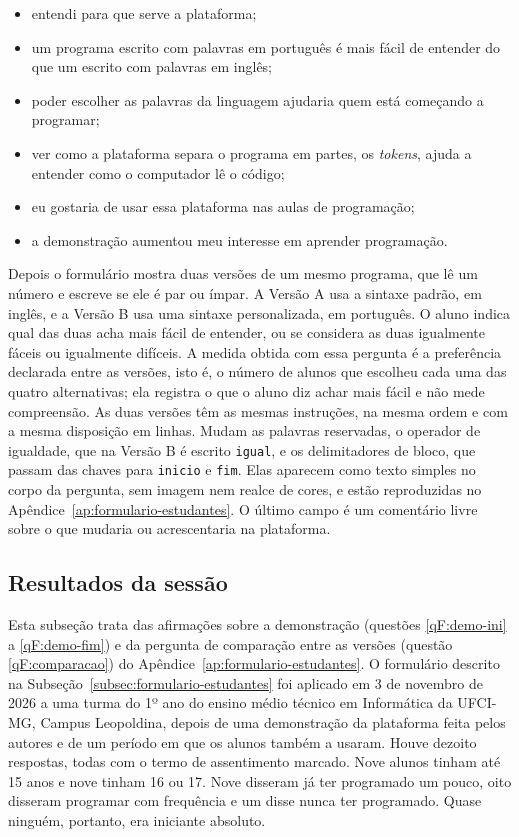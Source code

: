 \begin{itemize}
    \item entendi para que serve a plataforma;
    \item um programa escrito com palavras em português é mais fácil de entender do que um escrito com palavras em inglês;
    \item poder escolher as palavras da linguagem ajudaria quem está começando a programar;
    \item ver como a plataforma separa o programa em partes, os \textit{tokens}, ajuda a entender como o computador lê o código;
    \item eu gostaria de usar essa plataforma nas aulas de programação;
    \item a demonstração aumentou meu interesse em aprender programação.
\end{itemize}
 Depois o formulário mostra duas versões de um mesmo programa, que lê um número e escreve se ele é par ou ímpar. A Versão A usa a sintaxe padrão, em inglês, e a Versão B usa uma sintaxe personalizada, em português. O aluno indica qual das duas acha mais fácil de entender, ou se considera as duas igualmente fáceis ou igualmente difíceis. A medida obtida com essa pergunta é a preferência declarada entre as versões, isto é, o número de alunos que escolheu cada uma das quatro alternativas; ela registra o que o aluno diz achar mais fácil e não mede compreensão. As duas versões têm as mesmas instruções, na mesma ordem e com a mesma disposição em linhas. Mudam as palavras reservadas, o operador de igualdade, que na Versão B é escrito \texttt{igual}, e os delimitadores de bloco, que passam das chaves para \texttt{inicio} e \texttt{fim}. Elas aparecem como texto simples no corpo da pergunta, sem imagem nem realce de cores, e estão reproduzidas no Apêndice~\ref{ap:formulario-estudantes}. O último campo é um comentário livre sobre o que mudaria ou acrescentaria na plataforma.

\subsection{Resultados da sessão}
\label{sec:resultado-estudantes}

Esta subseção trata das afirmações sobre a demonstração (questões \ref{qF:demo-ini} a \ref{qF:demo-fim}) e da pergunta de comparação entre as versões (questão \ref{qF:comparacao}) do Apêndice~\ref{ap:formulario-estudantes}. O formulário descrito na Subseção~\ref{subsec:formulario-estudantes} foi aplicado em 3 de novembro de 2026 a uma turma do 1º ano do ensino médio técnico em Informática da UFCI-MG, Campus Leopoldina, depois de uma demonstração da plataforma feita pelos autores e de um período em que os alunos também a usaram. Houve dezoito respostas, todas com o termo de assentimento marcado. Nove alunos tinham até 15 anos e nove tinham 16 ou 17. Nove disseram já ter programado um pouco, oito disseram programar com frequência e um disse nunca ter programado. Quase ninguém, portanto, era iniciante absoluto.

